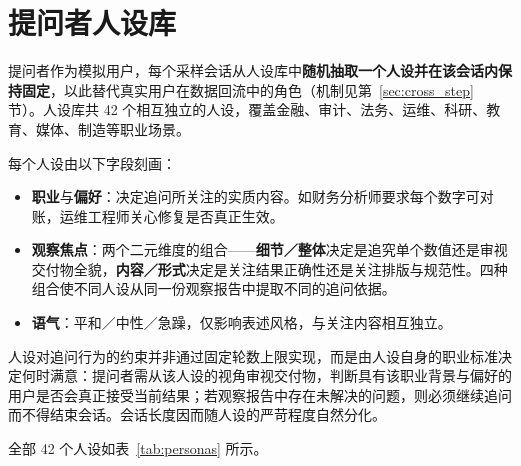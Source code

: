 \chapter{提问者人设库}
\label{app:personas}

提问者作为模拟用户，每个采样会话从人设库中\textbf{随机抽取一个人设并在该会话内保持固定}，以此替代真实用户在数据回流中的角色（机制见第~\ref{sec:cross_step} 节）。人设库共 42 个相互独立的人设，覆盖金融、审计、法务、运维、科研、教育、媒体、制造等职业场景。

每个人设由以下字段刻画：

\begin{itemize}
    \item \textbf{职业}与\textbf{偏好}：决定追问所关注的实质内容。如财务分析师要求每个数字可对账，运维工程师关心修复是否真正生效。
    \item \textbf{观察焦点}：两个二元维度的组合——\textbf{细节／整体}决定是追究单个数值还是审视交付物全貌，\textbf{内容／形式}决定是关注结果正确性还是关注排版与规范性。四种组合使不同人设从同一份观察报告中提取不同的追问依据。
    \item \textbf{语气}：平和／中性／急躁，仅影响表述风格，与关注内容相互独立。
\end{itemize}

人设对追问行为的约束并非通过固定轮数上限实现，而是由人设自身的职业标准决定何时满意：提问者需从该人设的视角审视交付物，判断具有该职业背景与偏好的用户是否会真正接受当前结果；若观察报告中存在未解决的问题，则必须继续追问而不得结束会话。会话长度因而随人设的严苛程度自然分化。

全部 42 个人设如表~\ref{tab:personas} 所示。

